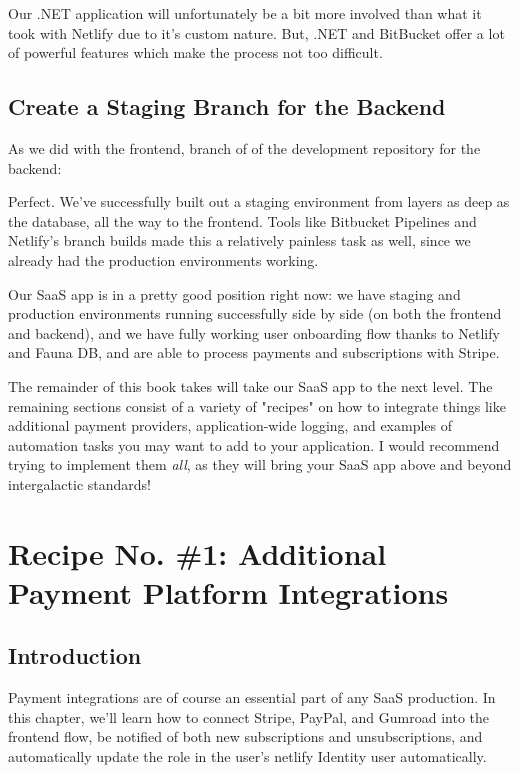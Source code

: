 \documentclass[a4paper,
                             oneside,
                             BCOR1.0cm,
                             DIV11,
                             parskip=full,
                             11pt]{scrbook}
\begin{document}
Our .NET application will unfortunately be a bit more involved than what it took with Netlify due to it's custom nature. But, .NET and BitBucket offer a lot of powerful features which make the process not too difficult.

\section{Create a Staging Branch for the Backend}\label{sec:titles}

As we did with the frontend, branch of of the development repository for the backend:


Perfect. We've successfully built out a staging environment from layers as deep as the database, all the way to the frontend. Tools like Bitbucket Pipelines and Netlify's branch builds made this a relatively painless task as well, since we already had the production environments working.


Our SaaS app is in a pretty good position right now: we have staging and production environments running successfully side by side (on both the frontend and backend), and we have fully working user onboarding flow thanks to Netlify and Fauna DB, and are able to process payments and subscriptions with Stripe. 

The remainder of this book takes will take our SaaS app to the next level. The remaining sections consist of a variety of "recipes" on how to integrate things like additional payment providers, application-wide logging, and examples of automation tasks you may want to add to your application. I would recommend trying to implement them \textit{all}, as they will bring your SaaS app above and beyond intergalactic standards! \rocket

\chapter{Recipe No. \#1: Additional Payment Platform Integrations}\label{cap:primer}

\section{Introduction}

Payment integrations are of course an essential part of any SaaS production. In this chapter, we'll learn how to connect Stripe, PayPal, and Gumroad into the frontend flow, be notified of both new subscriptions and unsubscriptions, and automatically update the role in the user's netlify Identity user automatically.
\end{document}
